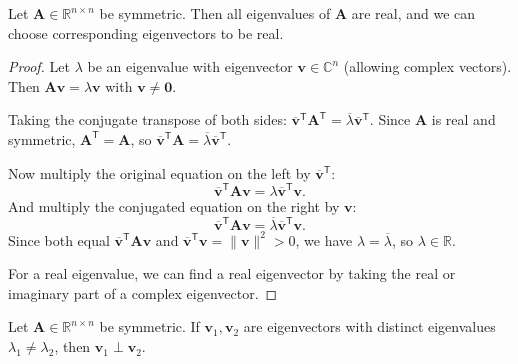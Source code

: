 \begin{lemma}\label{lem:symmetric-real-eigenvalues}
  Let $\mathbf{A} \in \mathbb{R}^{n \times n}$ be symmetric. Then all eigenvalues of $\mathbf{A}$ are real,
  and we can choose corresponding eigenvectors to be real.
\end{lemma}

\begin{proof}
  Let $\lambda$ be an eigenvalue with eigenvector $\mathbf{v} \in \mathbb{C}^n$ (allowing complex vectors).
  Then $\mathbf{A}\mathbf{v} = \lambda \mathbf{v}$ with $\mathbf{v} \neq \mathbf{0}$.

  Taking the conjugate transpose of both sides: $\overline{\mathbf{v}}^{\mathsf{T}} \mathbf{A}^{\mathsf{T}} = \overline{\lambda} \overline{\mathbf{v}}^{\mathsf{T}}$.
  Since $\mathbf{A}$ is real and symmetric, $\mathbf{A}^{\mathsf{T}} = \mathbf{A}$, so $\overline{\mathbf{v}}^{\mathsf{T}} \mathbf{A} = \overline{\lambda} \overline{\mathbf{v}}^{\mathsf{T}}$.

  Now multiply the original equation on the left by $\overline{\mathbf{v}}^{\mathsf{T}}$:
  \[
    \overline{\mathbf{v}}^{\mathsf{T}} \mathbf{A} \mathbf{v} = \lambda \overline{\mathbf{v}}^{\mathsf{T}} \mathbf{v}.
  \]
  And multiply the conjugated equation on the right by $\mathbf{v}$:
  \[
    \overline{\mathbf{v}}^{\mathsf{T}} \mathbf{A} \mathbf{v} = \overline{\lambda} \overline{\mathbf{v}}^{\mathsf{T}} \mathbf{v}.
  \]
  Since both equal $\overline{\mathbf{v}}^{\mathsf{T}} \mathbf{A} \mathbf{v}$ and $\overline{\mathbf{v}}^{\mathsf{T}} \mathbf{v} = \|\mathbf{v}\|^2 > 0$,
  we have $\lambda = \overline{\lambda}$, so $\lambda \in \mathbb{R}$.

  For a real eigenvalue, we can find a real eigenvector by taking the real or imaginary part of a complex eigenvector.
\end{proof}

\begin{lemma}\label{lem:distinct-eigenvalues-orthogonal}
  Let $\mathbf{A} \in \mathbb{R}^{n \times n}$ be symmetric. If $\mathbf{v}_1, \mathbf{v}_2$ are eigenvectors with distinct eigenvalues
  $\lambda_1 \neq \lambda_2$, then $\mathbf{v}_1 \perp \mathbf{v}_2$.
\end{lemma}

